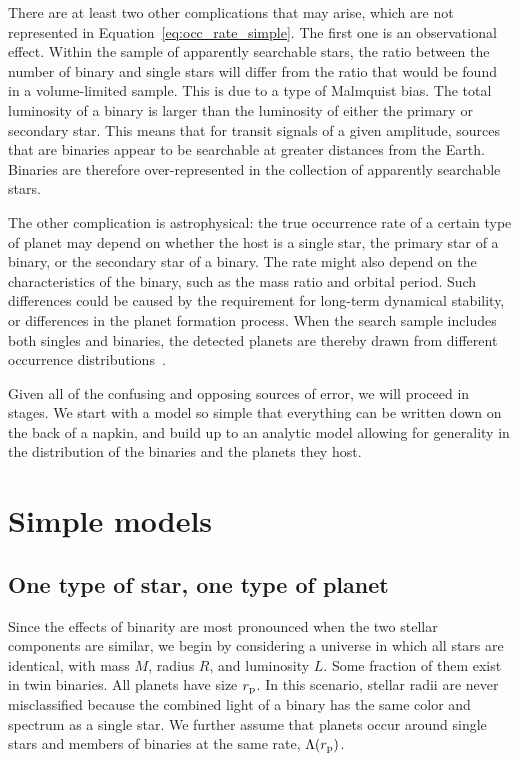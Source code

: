 \documentclass[12pt,modern]{aastex61}
\newcommand{\p}{_{\rm p}}
\begin{document}
There are at least two other complications that may arise, which are
not represented in Equation~\ref{eq:occ_rate_simple}.  The first one
is an observational effect. Within the sample of apparently searchable
stars, the ratio between the number of binary and single stars will
differ from the ratio that would be found in a volume-limited sample.
This is due to a type of Malmquist bias.  The total luminosity of a
binary is larger than the luminosity of either the primary or
secondary star.  This means that for transit signals of a given
amplitude, sources that are binaries appear to be searchable at
greater distances from the Earth.  Binaries are therefore
over-represented in the collection of apparently searchable stars.

The other complication is astrophysical: the true occurrence rate of a
certain type of planet may depend on whether the host is a single
star, the primary star of a binary, or the secondary star of a binary.
The rate might also depend on the characteristics of the binary, such
as the mass ratio and orbital period.  Such differences could be
caused by the requirement for long-term dynamical stability, or
differences in the planet formation process.  When the search sample
includes both singles and binaries, the detected planets are thereby
drawn from different occurrence distributions~\citep[see][]{
  wang_occurrence_2015,kraus_impact_2016}.

Given all of the confusing and opposing sources of error, we will
proceed in stages.  We start with a model so simple that everything
can be written down on the back of a napkin, and build up to an
analytic model allowing for generality in the distribution of the
binaries and the planets they host.  



\section{Simple models}
\label{sec:simplest}

\subsection{One type of star, one type of planet}
\label{sec:model_1}

Since the effects of binarity are most pronounced when the two stellar
components are similar, we begin by considering a universe in which
all stars are identical, with mass $M$, radius $R$, and luminosity
$L$.  Some fraction of them exist in twin binaries. All planets have
size $r\p$.  In this scenario, stellar radii are never misclassified
because the combined light of a binary has the same color and spectrum
as a single star.  We further assume that planets occur around single
stars and members of binaries at the same rate, $\Lambda(r\p)$.
\end{document}
